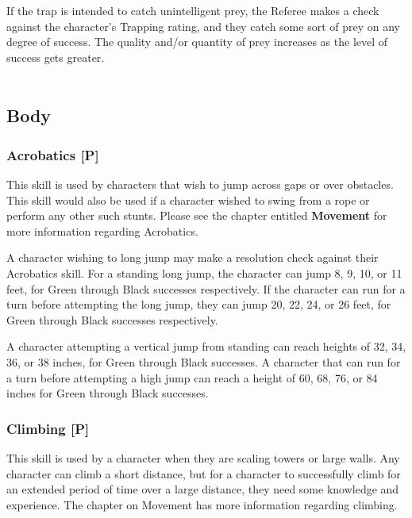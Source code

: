 \documentclass[oneside]{book}
\begin{document}
\begin{multicols}{2}
If the trap is intended to catch unintelligent prey, the Referee makes a check against the character's Trapping rating, and they catch some sort of prey on any degree of success. The quality and/or quantity of prey increases as the level of success gets greater. 
\\
\\
\subsection{Body}
\subsubsection{Acrobatics [P]}
This skill is used by characters that wish to jump across gaps or over obstacles. This skill would also be used if a character wished to swing from a rope or perform any other such stunts. Please see the chapter entitled \textbf{Movement} for more information regarding Acrobatics.

A character wishing to long jump may make a resolution check against their Acrobatics skill. For a standing long jump, the character can jump 8, 9, 10, or 11 feet, for Green through Black successes respectively.
If the character can run for a turn before attempting the long jump, they can jump 20, 22, 24, or 26 feet, for Green through Black successes respectively.

A character attempting a vertical jump from standing can reach heights of 32, 34, 36, or 38 inches, for Green through Black successes. A character that can run for a turn before attempting a high jump can reach a height of 60, 68, 76, or 84 inches for Green through Black successes.
\subsubsection{Climbing [P]}
This skill is used by a character when they are scaling towers or large walls. Any character can climb a short distance, but for a character to successfully climb for an extended period of time over a large distance, they need some knowledge and experience. The chapter on Movement has more information regarding climbing. 


\end{multicols}
\end{document}
